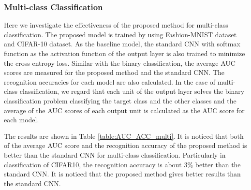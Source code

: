 \documentclass[twocolumn,10pt]{article}
\begin{document}
\subsubsection{Multi-class Classification}
Here we investigate the effectiveness of the proposed method for multi-class classification.
The proposed model is trained by using Fashion-MNIST dataset and CIFAR-10 dataset.
As the baseline model, the standard CNN with softmax function as the activation function of the output layer is also trained to minimize the cross entropy loss.
Similar with the binary classification, the average AUC scores are measured for the proposed method and the standard CNN.
The recognition accuracies for each model are also calculated.
In the case of multi-class classification, %
we regard that each unit of the output layer solves the binary classification problem classifying the target class and the other classes and the average of the AUC scores of each output unit is calculated as the AUC score for each model.

The results are shown in Table \ref{table:AUC_ACC_multi}.
It is noticed that both of the average AUC score and the recognition accuracy of the proposed method is better than the standard CNN for multi-class classification.
Particularly in classification of CIFAR10, the recognition accuracy is about 3$\%$ better than the standard CNN.
It is noticed that the proposed method gives better results than the standard CNN.
\end{document}
